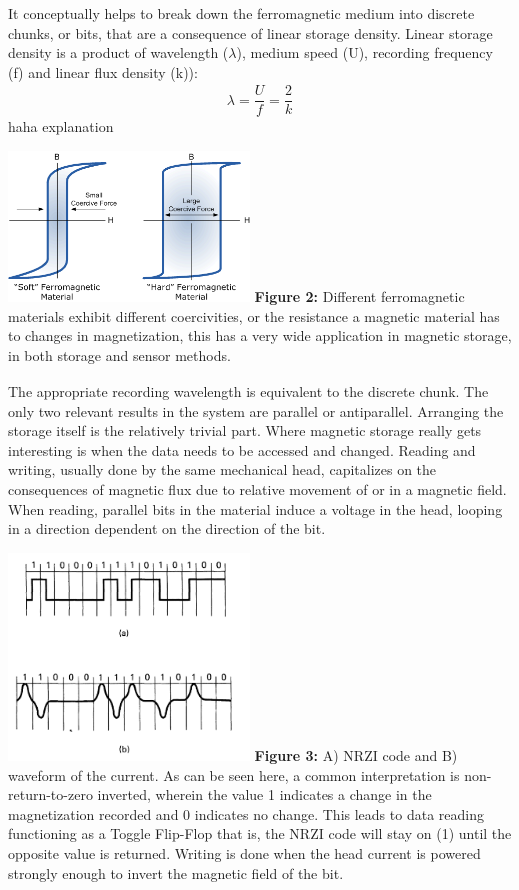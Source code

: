 \documentclass[11pt]{article}
\begin{document}
\begin{multicols}{2}
 It conceptually helps to break down the ferromagnetic medium into discrete chunks, or bits, that are a consequence of linear storage density. Linear storage density is a product of wavelength ($\lambda$), medium speed (U), recording frequency (f) and linear flux density (k)):
\begin{align*}
	\lambda= \dfrac{U}{f} = \dfrac{2}{k}
\end{align*}
haha explanation
\begin{center}
	\centering
	\includegraphics[width=0.48\textwidth]{mag_hysterisis.png}
	{\footnotesize\textbf{Figure 2:} Different ferromagnetic materials exhibit different coercivities, or the resistance a magnetic material has to changes in magnetization, this has a very wide application in magnetic storage, in both storage and sensor methods.\textsubscript{\cite{label7}}}
\end{center} 
The appropriate recording wavelength is equivalent to the discrete chunk. The only two relevant results in the system are parallel or antiparallel. Arranging the storage itself is the relatively trivial part. Where magnetic storage really gets interesting is when the data needs to be accessed and changed. Reading and writing, usually done by the same mechanical head, capitalizes on the consequences of magnetic flux due to relative movement of or in a magnetic field. When reading, parallel bits in the material induce a voltage in the head, looping in a direction dependent on the direction of the bit. 
\begin{center}
	\centering
	\includegraphics[width=0.48\textwidth]{Waveform_code.png}
	{\footnotesize\textbf{Figure 3:}  A) NRZI code and B) waveform of the current. As can be seen here, a common interpretation is non-return-to-zero inverted, wherein the value 1 indicates a change in the magnetization recorded and 0 indicates no change. This leads to data reading functioning as a Toggle Flip-Flop that is, the NRZI code will stay on (1) until the opposite value is returned. Writing is done when the head current is powered strongly enough to invert the magnetic field of the bit\textsubscript{\cite{label1}}}.
\end{center} 





\end{multicols}
\end{document}
